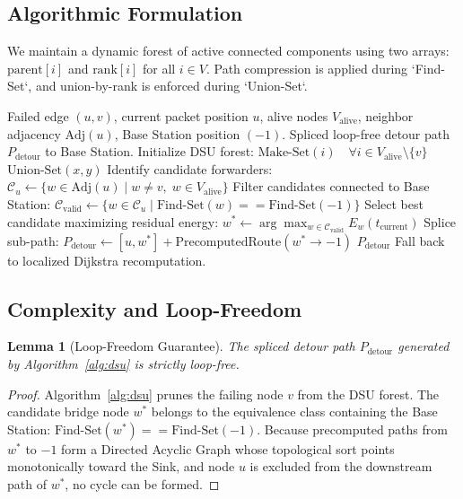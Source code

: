 \documentclass[journal]{IEEEtran}
\newtheorem{lemma}{Lemma}
\begin{document}
\subsection{Algorithmic Formulation}
We maintain a dynamic forest of active connected components using two arrays: $\text{parent}[i]$ and $\text{rank}[i]$ for all $i \in V$. Path compression is applied during `Find-Set`, and union-by-rank is enforced during `Union-Set`.

\begin{algorithm}[h]
\caption{DSU-Based In-Flight Detour Recovery}
\label{alg:dsu}
\begin{algorithmic}[1]
\REQUIRE Failed edge $(u, v)$, current packet position $u$, alive nodes $V_{\text{alive}}$, neighbor adjacency $\text{Adj}(u)$, Base Station position $(-1)$.
\ENSURE Spliced loop-free detour path $P_{\text{detour}}$ to Base Station.
\STATE Initialize DSU forest: $\text{Make-Set}(i) \quad \forall i \in V_{\text{alive}} \setminus \{v\}$
        \STATE $\text{Union-Set}(x, y)$
    \ENDIF
\ENDFOR
\STATE Identify candidate forwarders: $\mathcal{C}_u \leftarrow \{ w \in \text{Adj}(u) \mid w \ne v, \; w \in V_{\text{alive}} \}$
\STATE Filter candidates connected to Base Station:
\STATE $\mathcal{C}_{\text{valid}} \leftarrow \{ w \in \mathcal{C}_u \mid \text{Find-Set}(w) == \text{Find-Set}(-1) \}$
    \STATE Select best candidate maximizing residual energy:
    \STATE $w^* \leftarrow \arg\max_{w \in \mathcal{C}_{\text{valid}}} E_w(t_{\text{current}})$
    \STATE Splice sub-path: $P_{\text{detour}} \leftarrow [u, w^*] + \text{PrecomputedRoute}(w^* \to -1)$
    \RETURN $P_{\text{detour}}$
\ELSE
    \STATE Fall back to localized Dijkstra recomputation.
\ENDIF
\end{algorithmic}
\end{algorithm}

\subsection{Complexity and Loop-Freedom}
\begin{lemma}[Loop-Freedom Guarantee]
The spliced detour path $P_{\text{detour}}$ generated by Algorithm~\ref{alg:dsu} is strictly loop-free.
\end{lemma}
\begin{proof}
Algorithm~\ref{alg:dsu} prunes the failing node $v$ from the DSU forest. The candidate bridge node $w^*$ belongs to the equivalence class containing the Base Station: $\text{Find-Set}(w^*) == \text{Find-Set}(-1)$. Because precomputed paths from $w^*$ to $-1$ form a Directed Acyclic Graph whose topological sort points monotonically toward the Sink, and node $u$ is excluded from the downstream path of $w^*$, no cycle can be formed.
\end{proof}
\end{document}
